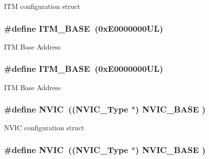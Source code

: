 I\-T\-M configuration struct \hypertarget{group___c_m_s_i_s__core__register_gadd76251e412a195ec0a8f47227a8359e}{
\subsubsection[{I\-T\-M\-\_\-\-B\-A\-S\-E}]{\setlength{\rightskip}{0pt plus 5cm}\#define I\-T\-M\-\_\-\-B\-A\-S\-E~(0x\-E0000000\-U\-L)}}\label{group___c_m_s_i_s__core__register_gadd76251e412a195ec0a8f47227a8359e}
I\-T\-M Base Address \hypertarget{group___c_m_s_i_s__core__register_gadd76251e412a195ec0a8f47227a8359e}{
\subsubsection[{I\-T\-M\-\_\-\-B\-A\-S\-E}]{\setlength{\rightskip}{0pt plus 5cm}\#define I\-T\-M\-\_\-\-B\-A\-S\-E~(0x\-E0000000\-U\-L)}}\label{group___c_m_s_i_s__core__register_gadd76251e412a195ec0a8f47227a8359e}
I\-T\-M Base Address \hypertarget{group___c_m_s_i_s__core__register_gac8e97e8ce56ae9f57da1363a937f8a17}{
\subsubsection[{N\-V\-I\-C}]{\setlength{\rightskip}{0pt plus 5cm}\#define N\-V\-I\-C~(({\bf N\-V\-I\-C\-\_\-\-Type}      $\ast$)     {\bf N\-V\-I\-C\-\_\-\-B\-A\-S\-E}     )}}\label{group___c_m_s_i_s__core__register_gac8e97e8ce56ae9f57da1363a937f8a17}
N\-V\-I\-C configuration struct \hypertarget{group___c_m_s_i_s__core__register_gac8e97e8ce56ae9f57da1363a937f8a17}{
\subsubsection[{N\-V\-I\-C}]{\setlength{\rightskip}{0pt plus 5cm}\#define N\-V\-I\-C~(({\bf N\-V\-I\-C\-\_\-\-Type}      $\ast$)     {\bf N\-V\-I\-C\-\_\-\-B\-A\-S\-E}     )}}\label{group___c_m_s_i_s__core__register_gac8e97e8ce56ae9f57da1363a937f8a17}
